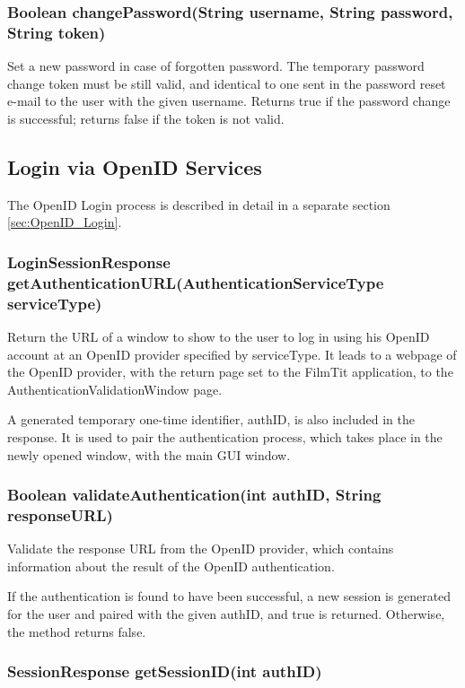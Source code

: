 \subsubsection{Boolean changePassword(String username, String password, String token)}
Set a new password in case of forgotten password.
The temporary password change token must be still valid,
and identical to one sent in the password reset e-mail
to the user with the given username.
Returns true if the password change is successful;
returns false if the token is not valid.

\subsection{Login via OpenID Services}
\label{subsubsec:gui_openid}

The OpenID Login process is described in detail in a separate section \ref{sec:OpenID_Login}.

\subsubsection{LoginSessionResponse getAuthenticationURL(AuthenticationServiceType serviceType)}

Return the URL of a window to show to the user to log in using his OpenID account at an OpenID provider specified by serviceType. It leads to a webpage of the OpenID provider, with the return page set to the FilmTit application, to the AuthenticationValidationWindow page.

A generated temporary one-time identifier, authID, is also included in the response. It is used to pair the authentication process, which takes place in the newly opened window, with the main GUI window.

\subsubsection{Boolean validateAuthentication(int authID, String responseURL)}

Validate the response URL from the OpenID provider, which contains information about the result of the OpenID authentication.

If the authentication is found to have been successful, a new session is generated for the user and paired with the given authID, and true is returned.
Otherwise, the method returns false.

\subsubsection{SessionResponse getSessionID(int authID)}

